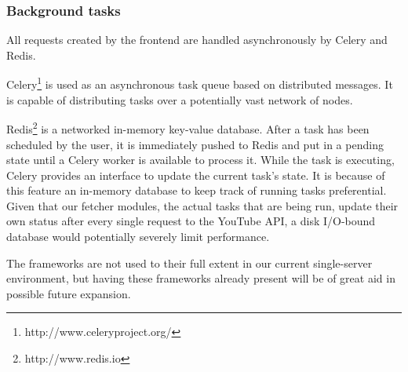 \subsubsection{Background tasks}
All requests created by the frontend are handled asynchronously by Celery and
Redis.

Celery\footnote{http://www.celeryproject.org/} is used as an asynchronous task
queue based on distributed messages. It is capable of distributing tasks over a
potentially vast network of nodes.

Redis\footnote{http://www.redis.io} is a networked in-memory key-value database.
After a task has been scheduled by the user, it is immediately pushed to Redis
and put in a pending state until a Celery worker is available to process it.
While the task is executing, Celery provides an interface to update the current
task's state. It is because of this feature an in-memory database to keep track of running
tasks preferential. Given that our fetcher modules, the actual tasks that are
being run, update their own status after every single request to
the YouTube API, a disk I/O-bound database would potentially severely limit
performance.

The frameworks are not used to their full extent in our current single-server
environment, but having these frameworks already present will be of great aid in
possible future expansion. 


